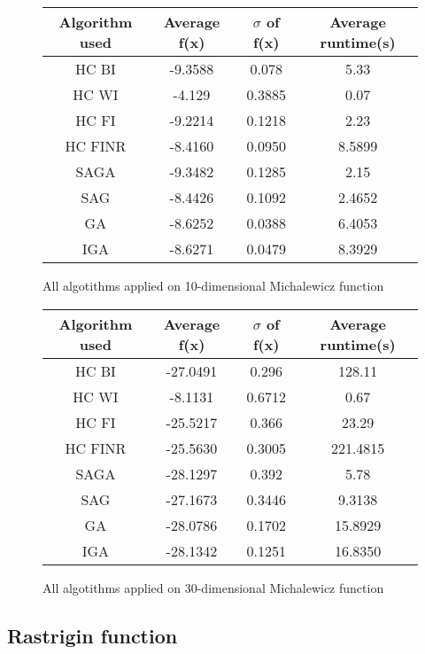 \documentclass{article}
\begin{document}
\begin{figure}[H]
	\begin{tabular}{|c||c|c|c|} \hline
		Algorithm used & Average f(x) & $\sigma$ of f(x) & Average runtime(s) \\ \hline \hline
		HC BI & -9.3588 & 0.078 & 5.33 \\ \hline
		HC WI & -4.129 & 0.3885 & 0.07 \\ \hline
		HC FI & -9.2214 & 0.1218 & 2.23 \\ \hline
		HC FINR & -8.4160 & 0.0950 & 8.5899 \\ \hline
		SAGA & -9.3482 & 0.1285 & 2.15 \\ \hline
		SAG & -8.4426 & 0.1092 & 2.4652 \\ \hline
        GA & -8.6252 & 0.0388 & 6.4053 \\ \hline
		IGA & -8.6271 & 0.0479 & 8.3929 \\ \hline
\end{tabular}
\caption{All algotithms applied on 10-dimensional Michalewicz function}
\end{figure}

\begin{figure}[H]
	\begin{tabular}{|c||c|c|c|} \hline
		Algorithm used & Average f(x) & $\sigma$ of f(x) & Average runtime(s) \\ \hline \hline
		HC BI & -27.0491 & 0.296 & 128.11 \\ \hline
		HC WI & -8.1131 & 0.6712 & 0.67 \\ \hline
		HC FI & -25.5217 & 0.366 & 23.29 \\ \hline
		HC FINR & -25.5630 & 0.3005 & 221.4815 \\ \hline
		SAGA & -28.1297 & 0.392 & 5.78 \\ \hline
		SAG & -27.1673 & 0.3446 & 9.3138 \\ \hline
        GA & -28.0786 & 0.1702 & 15.8929 \\ \hline
		IGA & -28.1342 & 0.1251 & 16.8350 \\ \hline
\end{tabular}
\caption{All algotithms applied on 30-dimensional Michalewicz function}
\end{figure}

\subsection{Rastrigin function}
\end{document}
